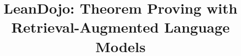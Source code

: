 \documentclass{article}
\title{LeanDojo: Theorem Proving with Retrieval-Augmented Language Models}
\begin{document}
\maketitle










\resettocdepth

\clearpage
{\small


}

\appendix
\clearpage
\renewcommand{\contentsname}{Appendix}
\tableofcontents
\clearpage

\end{document}
